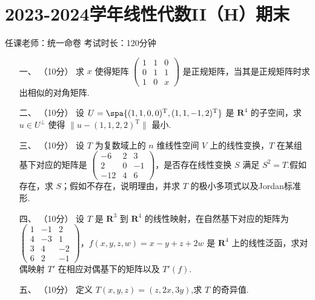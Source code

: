 \section*{2023-2024学年线性代数II（H）期末}

\begin{center}
    任课老师：统一命卷\hspace{4em} 考试时长：120分钟
\end{center}

\begin{enumerate}
    \item[一、]（10分）
    求 $x$ 使得矩阵 $\begin{pmatrix}
        1 & 1 & 0 \\
        0 & 1 & 1 \\
        1 & 0 & x
    \end{pmatrix}$ 是正规矩阵，当其是正规矩阵时求出相似的对角矩阵.

    \item[二、]（10分）
    设 $U = \spa\{(1,1,0,0)^{\mathrm{T}},(1,1,-1,2)^{\mathrm{T}}\}$ 是 $\mathbf{R}^4$ 的子空间，求 $u \in U^\perp$ 使得 $\lVert u - (1,1,2,2)^{\mathrm{T}} \rVert$ 最小.

    \item[三、]（10分）
    设 $T$ 为复数域上的 $n$ 维线性空间 $V$ 上的线性变换，$T$ 在某组基下对应的矩阵是 $\begin{pmatrix}
        -6 & 2 & 3 \\
        2 & 0 & -1 \\
        -12 & 4 & 6
    \end{pmatrix}$，是否存在线性变换 $S$ 满足 $S^2 = T$.假如存在，求 $S$；假如不存在，说明理由，并求 $T$ 的极小多项式以及Jordan标准形.

    \item[四、]（10分）
    设 $T$ 是 $\mathbf{R}^3$ 到 $\mathbf{R}^4$ 的线性映射，在自然基下对应的矩阵为 $\begin{pmatrix}
        1 & -1 & 2 \\
        4 & -3 & 1 \\
        3 & 4 & -2 \\
        6 & 2 & -1
    \end{pmatrix}$，$f(x,y,z,w) = x - y + z + 2w$ 是 $\mathbf{R}^4$ 上的线性泛函，求对偶映射 $T'$ 在相应对偶基下的矩阵以及 $T'(f)$.

    \item[五、]（10分）
    定义 $T(x,y,z) = (z,2x,3y)$,求 $T$ 的奇异值.


\end{enumerate}
